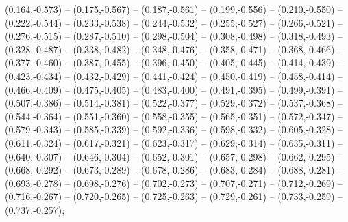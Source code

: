 (0.164,-0.573) -- (0.175,-0.567) -- (0.187,-0.561) -- (0.199,-0.556) -- (0.210,-0.550) -- (0.222,-0.544) -- (0.233,-0.538) -- (0.244,-0.532) -- (0.255,-0.527) -- (0.266,-0.521) -- (0.276,-0.515) -- (0.287,-0.510) -- (0.298,-0.504) -- (0.308,-0.498) -- (0.318,-0.493) -- (0.328,-0.487) -- (0.338,-0.482) -- (0.348,-0.476) -- (0.358,-0.471) -- (0.368,-0.466) -- (0.377,-0.460) -- (0.387,-0.455) -- (0.396,-0.450) -- (0.405,-0.445) -- (0.414,-0.439) -- (0.423,-0.434) -- (0.432,-0.429) -- (0.441,-0.424) -- (0.450,-0.419) -- (0.458,-0.414) -- (0.466,-0.409) -- (0.475,-0.405) -- (0.483,-0.400) -- (0.491,-0.395) -- (0.499,-0.391) -- (0.507,-0.386) -- (0.514,-0.381) -- (0.522,-0.377) -- (0.529,-0.372) -- (0.537,-0.368) -- (0.544,-0.364) -- (0.551,-0.360) -- (0.558,-0.355) -- (0.565,-0.351) -- (0.572,-0.347) -- (0.579,-0.343) -- (0.585,-0.339) -- (0.592,-0.336) -- (0.598,-0.332) -- (0.605,-0.328) -- (0.611,-0.324) -- (0.617,-0.321) -- (0.623,-0.317) -- (0.629,-0.314) -- (0.635,-0.311) -- (0.640,-0.307) -- (0.646,-0.304) -- (0.652,-0.301) -- (0.657,-0.298) -- (0.662,-0.295) -- (0.668,-0.292) -- (0.673,-0.289) -- (0.678,-0.286) -- (0.683,-0.284) -- (0.688,-0.281) -- (0.693,-0.278) -- (0.698,-0.276) -- (0.702,-0.273) -- (0.707,-0.271) -- (0.712,-0.269) -- (0.716,-0.267) -- (0.720,-0.265) -- (0.725,-0.263) -- (0.729,-0.261) -- (0.733,-0.259) -- (0.737,-0.257);
